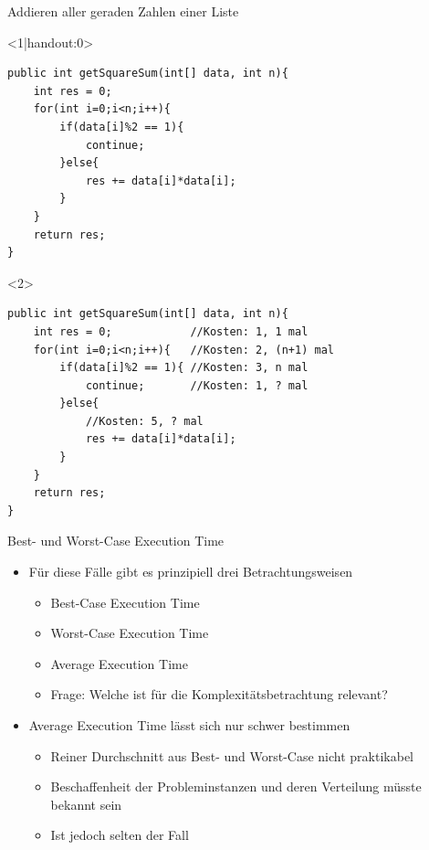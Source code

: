 \begin{frame}[fragile]{Addieren aller geraden Zahlen einer Liste}
\lstset{style=java}
\begin{onlyenv}<1|handout:0>
\begin{lstlisting}
public int getSquareSum(int[] data, int n){
    int res = 0;
    for(int i=0;i<n;i++){
        if(data[i]%2 == 1){
            continue;
        }else{
            res += data[i]*data[i];
        }
    }
    return res;
}
\end{lstlisting}
\end{onlyenv}
\begin{onlyenv}<2>
\begin{lstlisting}
public int getSquareSum(int[] data, int n){
    int res = 0;            //Kosten: 1, 1 mal
    for(int i=0;i<n;i++){   //Kosten: 2, (n+1) mal
        if(data[i]%2 == 1){ //Kosten: 3, n mal
            continue;       //Kosten: 1, ? mal
        }else{
            //Kosten: 5, ? mal
            res += data[i]*data[i];
        }
    }
    return res;
}
\end{lstlisting}
\end{onlyenv}
\end{frame}

\begin{frame}{Best- und Worst-Case Execution Time}
    \begin{itemize}[<+->]
        \item Für diese Fälle gibt es prinzipiell drei Betrachtungsweisen
        \begin{itemize}
            \item Best-Case Execution Time
            \item Worst-Case Execution Time
            \item Average Execution Time
            \item Frage: Welche ist für die Komplexitätsbetrachtung relevant?
        \end{itemize}
        \item Average Execution Time lässt sich nur schwer bestimmen
        \begin{itemize}
            \item Reiner Durchschnitt aus Best- und Worst-Case nicht praktikabel
            \item Beschaffenheit der Probleminstanzen und deren Verteilung müsste bekannt sein
            \item Ist jedoch selten der Fall
        \end{itemize}
    \end{itemize}
\end{frame}

